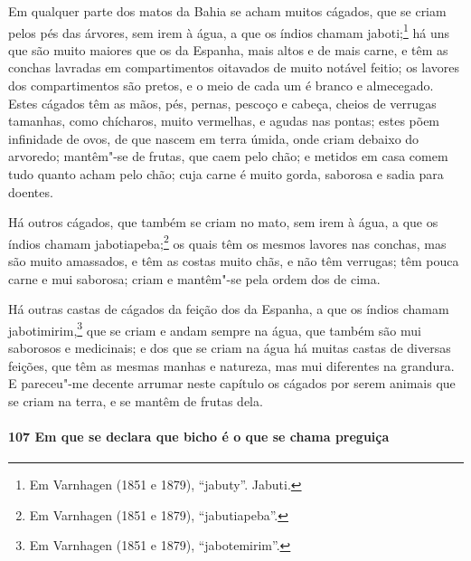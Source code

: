 Em qualquer parte dos matos da Bahia se acham muitos cágados, que se criam pelos pés das
árvores, sem irem à água, a que os índios chamam jaboti;\footnote{ Em Varnhagen (1851 e
1879), ``jabuty''. Jabuti.} há uns que são muito maiores que os da Espanha, mais altos e
de mais carne, e têm as conchas lavradas em compartimentos oitavados de muito notável
feitio; os lavores dos compartimentos são pretos, e o meio de cada um é branco e
almecegado. Estes cágados têm as mãos, pés, pernas, pescoço e cabeça, cheios de verrugas
tamanhas, como chícharos, muito vermelhas, e agudas nas pontas; estes põem infinidade de
ovos, de que nascem em terra úmida, onde criam debaixo do arvoredo; mantêm"-se de frutas,
que caem pelo chão; e metidos em casa comem tudo quanto acham pelo chão; cuja carne é
muito gorda, saborosa e sadia para doentes.

Há outros cágados, que também se criam no mato, sem irem à água, a que os índios chamam
jabotiapeba;\footnote{ Em Varnhagen (1851 e 1879), ``jabutiapeba''.} os quais têm os
mesmos lavores nas conchas, mas são muito amassados, e têm as costas muito chãs, e não têm
verrugas; têm pouca carne e mui saborosa; criam e mantêm"-se pela ordem dos de cima.

Há outras castas de cágados da feição dos da Espanha, a que os índios chamam
jabotimirim,\footnote{ Em Varnhagen (1851 e 1879), ``jabotemirim''.} que se criam e andam
sempre na água, que também são mui saborosos e medicinais; e dos que se criam na água há
muitas castas de diversas feições, que têm as mesmas manhas e natureza, mas mui diferentes
na grandura. E pareceu"-me decente arrumar neste capítulo os cágados por serem animais que
se criam na terra, e se mantêm de frutas dela.

\paragraph{107 Em que se declara que bicho é o que se chama preguiça}

